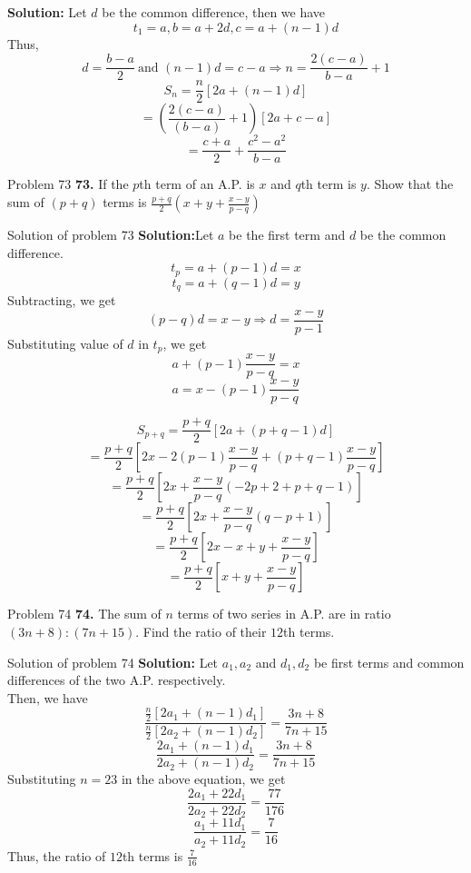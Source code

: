 \documentclass[aspectratio=1610,8pt]{beamer}
\begin{document}
\begin{frame}
  \textbf{Solution:} Let $d$ be the common difference, then we have
  $$t_1 = a, b = a + 2d, c = a + (n - 1)d$$
  Thus, $$d = \frac{b - a}{2}~\text{and~} (n - 1)d = c - a \Rightarrow n = \frac{2(c -
    a)}{b - a} + 1$$
  $$S_n = \frac{n}{2}[2a + (n - 1)d]$$
  $$= \left(\frac{2(c - a)}{(b - a)} + 1\right)[2a + c - a]$$
  $$= \frac{c + a}{2} + \frac{c^2 - a^2}{b - a}$$
\end{frame}
\begin{frame}{Problem 73}
  \textbf{73.} If the $p$th term of an A.P. is $x$ and $q$th term is $y$. Show
  that the sum of $(p + q)$ terms is $\frac{p + q}{2}\left(x + y + \frac{x -
      y}{p - q}\right)$
\end{frame}
\begin{frame}{Solution of problem 73}
  \textbf{Solution:}Let $a$ be the first term and $d$ be the common difference.
  $$t_p = a + (p - 1)d = x$$
  $$t_q = a + (q - 1)d = y$$
  Subtracting, we get
  $$(p - q)d = x - y\Rightarrow d = \frac{x - y}{p - 1}$$
  Substituting value of $d$ in $t_p$, we get $$a + (p - 1)\frac{x - y}{p -q} =
  x$$
  $$ a = x - (p - 1)\frac{x - y}{p - q}$$

  $$S_{p + q} = \frac{p+q}{2}[2a + (p + q - 1)d]$$
  $$=\frac{p + q}{2}\left[2x - 2(p - 1)\frac{x - y}{p - q} + (p + q - 1)\frac{x
      - y}{p -q}\right]$$
  $$= \frac{p + q}{2}\left[2x + \frac{x- y}{p -q}(-2p + 2 + p + q - 1)\right]$$
  $$= \frac{p + q}{2}\left[2x + \frac{x - y}{p - q}(q - p + 1)\right]$$
  $$= \frac{p + q}{2}\left[2x - x + y + \frac{x - y}{p -q}\right]$$
  $$= \frac{p  + q}{2}\left[x + y + \frac{x - y}{p - q}\right]$$
\end{frame}
\begin{frame}{Problem 74}
  \textbf{74.} The sum of $n$ terms of two series in A.P. are in ratio $(3n +
  8):(7n + 15)$. Find the ratio of their $12$th terms.
\end{frame}
\begin{frame}{Solution of problem 74}
  \textbf{Solution:} Let $a_1, a_2$ and $d_1, d_2$ be first terms and common
  differences of the two A.P. respectively.\\
  Then, we have
  $$\frac{\frac{n}{2}[2a_1 + (n - 1)d_1]}{\frac{n}{2}[2a_2 + (n - 1)d_2]} =
  \frac{3n + 8}{7n + 15}$$
  $$\frac{2a_1 + (n - 1)d_1}{2a_2 + (n - 1)d_2} = \frac{3n + 8}{7n + 15}$$
  Substituting $n = 23$ in the above equation, we get
  $$\frac{2a_1 + 22d_1}{2a_2 + 22d_2} = \frac{77}{176}$$
  $$\frac{a_1 + 11d_1}{a_2 + 11d_2} = \frac{7}{16}$$
  Thus, the ratio of $12$th terms is $\frac{7}{16}$
\end{frame}
\end{document}
